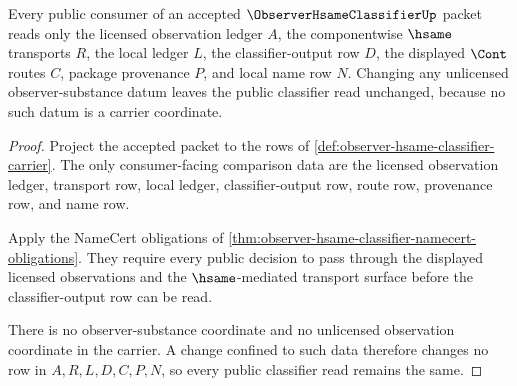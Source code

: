 \begin{theorem}
\label{thm:observer-hsame-classifier-nonescape}
Every public consumer of an accepted $\ObserverHsameClassifierUp$ packet reads only the licensed observation ledger $A$, the componentwise $\hsame$ transports $R$, the local ledger $L$, the classifier-output row $D$, the displayed $\Cont$ routes $C$, package provenance $P$, and local name row $N$. Changing any unlicensed observer-substance datum leaves the public classifier read unchanged, because no such datum is a carrier coordinate.
\end{theorem}
\begin{proof}
Project the accepted packet to the rows of \autoref{def:observer-hsame-classifier-carrier}. The only consumer-facing comparison data are the licensed observation ledger, transport row, local ledger, classifier-output row, route row, provenance row, and name row.

Apply the NameCert obligations of \autoref{thm:observer-hsame-classifier-namecert-obligations}. They require every public decision to pass through the displayed licensed observations and the $\hsame$-mediated transport surface before the classifier-output row can be read.

There is no observer-substance coordinate and no unlicensed observation coordinate in the carrier. A change confined to such data therefore changes no row in $A,R,L,D,C,P,N$, so every public classifier read remains the same.
\end{proof}

